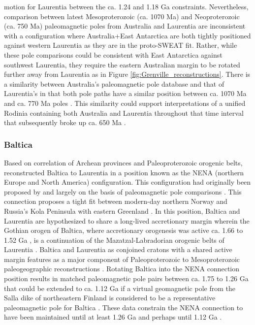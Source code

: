 \documentclass[twocolumn, switch]{article} %
\begin{document}
motion for Laurentia between the ca. 1.24 and 1.18 Ga constraints. Nevertheless, comparison between latest Mesoproterozoic (ca. 1070 Ma) and Neoproterozoic (ca. 750 Ma) paleomagnetic poles from Australia and Laurentia are inconsistent with a configuration where Australia+East Antarctica are both tightly positioned against western Laurentia as they are in the proto-SWEAT fit. Rather, while these pole comparisons could be consistent with East Antarctica against southwest Laurentia, they require the eastern Australian margin to be rotated further away from Laurentia as in Figure \ref{fig:Grenville_reconstructions}. There is a similarity between Australia's paleomagnetic pole database and that of Laurentia's in that both pole paths have a similar position between ca. 1070 Ma and ca. 770 Ma poles \citep{Swanson-Hysell2012a}. This similarity could support interpretations of a unified Rodinia containing both Australia and Laurentia throughout that time interval \citep{Swanson-Hysell2012a} that subsequently broke up ca. 650 Ma \citep{Li2011a}.

\subsubsection{Baltica}

Based on correlation of Archean provinces and Paleoproterozoic orogenic belts, \cite{Gower1990a} reconstructed Baltica to Laurentia in a position known as the NENA (northern Europe and North America) configuration. This configuration had originally been proposed by \citet{Patchett1978a} and \citet{Piper1980a} largely on the basis of paleomagnetic pole comparisons . This connection proposes a tight fit between modern-day northern Norway and Russia's Kola Peninsula with eastern Greenland \citep{Gower1990a, Salminen2021b}. In this position, Baltica and Laurentia are hypothesized to share a long-lived accretionary margin wherein the Gothian orogen of Baltica, where accretionary orogenesis was active ca. 1.66 to 1.52 Ga \citep{Bergstrom2020a}, is a continuation of the Mazatzal-Labradorian orogenic belts of Laurentia \citep{Karlstrom2001a}. Baltica and Laurentia as conjoined cratons with a shared active margin features as a major component of Paleoproterozoic to Mesoproterozoic paleogeographic reconstructions \citep{Evans2011a, Zhang2012a, Elming2021a}. Rotating Baltica into the NENA connection position results in matched paleomagnetic pole pairs between ca. 1.75 to 1.26 Ga \citep{Buchan2000a, Evans2008a} that could be extended to ca. 1.12 Ga if a virtual geomagnetic pole from the Salla dike of northeastern Finland is considered to be a representative paleomagnetic pole for Baltica \citep{Salminen2009b}. These data constrain the NENA connection to have been maintained until at least 1.26 Ga and perhaps until 1.12 Ga \citep{Salminen2021b}. 
\end{document}

